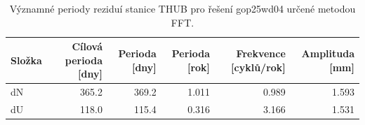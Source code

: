 \begin{table}[htbp]
\caption{Významné periody reziduí stanice THUB pro řešení gop25wd04 určené metodou FFT.}
\label{tab:gop25wd04_stcd_thub_detr_weighted_1seg_spectral_fft_significant_periods}
\begin{tabular}{lrrrrr}
\toprule
Složka & Cílová perioda [dny] & Perioda [dny] & Perioda [rok] & Frekvence [cyklů/rok] & Amplituda [mm] \\
\midrule
dN & 365.2 & 369.2 & 1.011 & 0.989 & 1.593 \\
dU & 118.0 & 115.4 & 0.316 & 3.166 & 1.531 \\
\bottomrule
\end{tabular}
\end{table}
